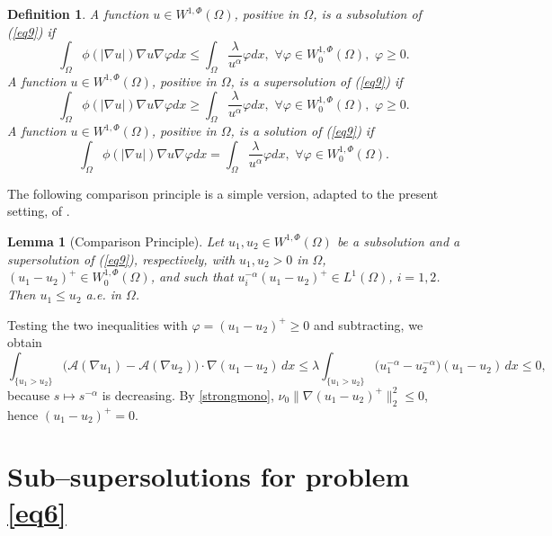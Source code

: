 \documentclass[11pt,leqno]{amsart}
\makeatletter
\newtheorem{lemma}[theorem]{Lemma}
\newtheorem{definition}[theorem]{Definition}
\renewenvironment{proof}[1][\proofname]{%
  \par
  \pushQED{\qed}%
  \normalfont
  \topsep6\p@\@plus6\p@\relax
  \trivlist
  \item[\hskip\labelsep\itshape #1\@addpunct{.}]%
  \hspace{0.5em}\ignorespaces
}{%
  \popQED
  \endtrivlist\@endpefalse
}
\makeatother
\begin{document}
\begin{definition}
	A function $u \in W^{1, \Phi}(\Omega)$, positive in $\Omega$, is a subsolution of (\ref{eq9}) if
	$$
	\int_{\Omega} \phi(|\nabla u|) \nabla u \nabla \varphi d x \leq \int_{\Omega} \displaystyle\frac{\lambda}{u^{\alpha	}} \varphi d x, \,\, \forall \varphi \in W_{0}^{1, \Phi}(\Omega), \,\, \varphi \geq 0.
	$$
	A function $u \in W^{1, \Phi}(\Omega)$, positive in $\Omega$, is a supersolution of (\ref{eq9}) if
	$$
	\int_{\Omega} \phi(|\nabla u|) \nabla u \nabla \varphi d x \geq \int_{\Omega} \displaystyle\frac{\lambda}{u^{\alpha	}}\varphi d x, \,\,  \forall  \varphi \in W_{0}^{1, \Phi}(\Omega), \,\, \varphi \geq 0.
	$$
	A function $u \in W^{1, \Phi}(\Omega)$, positive in $\Omega$, is a solution of (\ref{eq9}) if
	$$
	\int_{\Omega} \phi(|\nabla u|) \nabla u \nabla \varphi d x = \int_{\Omega} \displaystyle\frac{\lambda}{u^{\alpha	}}\varphi d x,  \,\,   \forall   \varphi \in W_{0}^{1,\Phi}(\Omega).
	$$
\end{definition}
The following comparison principle is a simple version, adapted to the
present setting, of \cite[Theorem 1.2]{GCS}.
\begin{lemma} [Comparison Principle] \label{comp.lemma}
	Let $u_{1}, u_{2} \in W^{1, \Phi}(\Omega)$ be a subsolution and a supersolution of (\ref{eq9}), respectively, with $u_1,u_2>0$ in $\Omega$, $(u_1-u_2)^+\in W_0^{1,\Phi}(\Omega)$, and such that $u_i^{-\alpha}(u_1-u_2)^+\in L^1(\Omega)$, $i=1,2$. Then $u_{1} \leq u_{2}$ a.e. in $\Omega$.
\end{lemma}
\begin{proof}
Testing the two inequalities with $\varphi=(u_1-u_2)^+\ge0$ and subtracting, we obtain
\[
\int_{\{u_1>u_2\}}\bigl(\mathcal A(\nabla u_1)-\mathcal A(\nabla u_2)\bigr)\cdot\nabla(u_1-u_2)\,dx
\le\lambda\int_{\{u_1>u_2\}}\bigl(u_1^{-\alpha}-u_2^{-\alpha}\bigr)(u_1-u_2)\,dx\le0,
\]
because $s\mapsto s^{-\alpha}$ is decreasing. By \eqref{strongmono},
$\nu_0\|\nabla(u_1-u_2)^+\|_2^2\le0$, hence $(u_1-u_2)^+=0$.
\end{proof}

\section{Sub--supersolutions for problem \eqref{eq6}}\label{S3}
\end{document}
